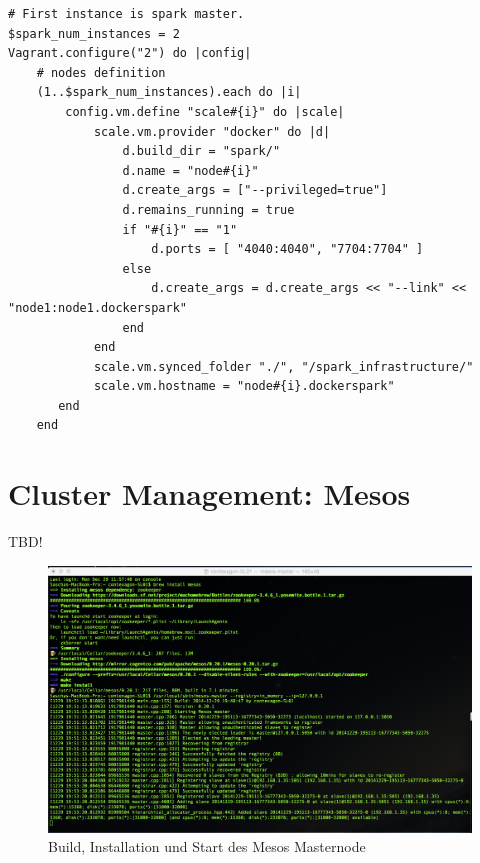 \begin{lstlisting}[label=setup spark,caption=Vagrant Provisionierungs-Skript für Spark]
# First instance is spark master.
$spark_num_instances = 2
Vagrant.configure("2") do |config|
    # nodes definition
    (1..$spark_num_instances).each do |i|
        config.vm.define "scale#{i}" do |scale|
            scale.vm.provider "docker" do |d|
                d.build_dir = "spark/"
                d.name = "node#{i}"
                d.create_args = ["--privileged=true"]
                d.remains_running = true
                if "#{i}" == "1"
                    d.ports = [ "4040:4040", "7704:7704" ] 
                else
                    d.create_args = d.create_args << "--link" << "node1:node1.dockerspark"
                end
            end
            scale.vm.synced_folder "./", "/spark_infrastructure/"
            scale.vm.hostname = "node#{i}.dockerspark"
       end 
    end

\end{lstlisting}




  

\section{Cluster Management: Mesos }
\label{section:mesos}

TBD!

\begin{figure}[htb!]
\centering
\includegraphics[width=1.0\textwidth]{bilder/mesos.png}
\caption{Build, Installation und Start des Mesos Masternode }
\label{fig:mesos master]}
\end{figure} 




